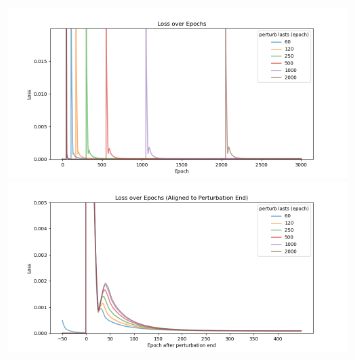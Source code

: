 \documentclass[12pt, a4paper]{article}
\begin{document}
\begin{figure}[H]
    \centering
    \includegraphics[width=0.8\textwidth]{FNN/fig/0214_abb05_perturb_loss_train.png} \\
    \includegraphics[width=0.8\textwidth]{FNN/fig/0214_abb05_perturb_loss_align.png}
\end{figure}
\end{document}
